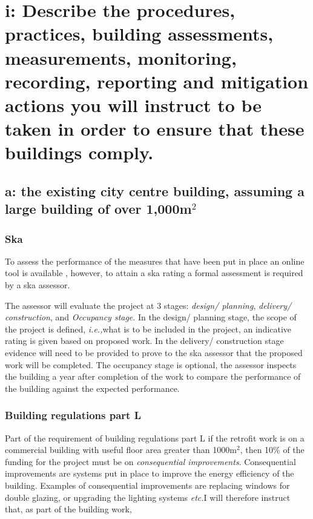 \documentclass[a4paper,fleqn]{article}
\makeatletter
\newcommand{\ie}{\emph{i.e.,\@\xspace}}
\newcommand{\etc}{\emph{etc.\@\xspace}}
\let\stdsection\section
\renewcommand{\section}{\newpage\stdsection}
\renewcommand{\cite}{\citep}
\makeatother
\begin{document}
\stdsection*{i: Describe the procedures, practices, building assessments, measurements,
	monitoring, recording, reporting and mitigation actions you will instruct to be taken
	in order to ensure that these buildings comply.}


\subsection*{a: the existing city centre building, assuming a large building of over 1,000m$^2$}
\subsubsection*{Ska}

To assess the performance of the measures that have been put in place an online tool is available \cite{ska2013}, 
however, to attain a ska rating a formal assessment is required by a ska assessor. 

The assessor will evaluate the project at 3 stages: \emph{design/ planning}, \emph{delivery/ construction}, and 
\emph{Occupancy stage}. In the design/ planning stage, the scope of the project is defined, \ie what is to be 
included in the project, an indicative rating is given based on proposed work. In the delivery/ construction 
stage evidence will need to be provided to prove to the ska assessor that the proposed work will be completed.
The occupancy stage is optional, the assessor inspects the building a year after completion of the work to 
compare the performance of the building against the expected performance.



\subsubsection*{Building regulations part L}
Part of the requirement of building regulations part L if the retrofit work is on a commercial building with 
useful floor area greater than 1000m$^2$, then 10\% of the funding for the project must be on 
\emph{consequential improvements}. Consequential improvements are systems put in place to improve the energy 
efficiency of the building. Examples of consequential improvements are replacing windows for double glazing, or 
upgrading the lighting systems \etc I will therefore instruct that, as part of the building work, 
\end{document}
